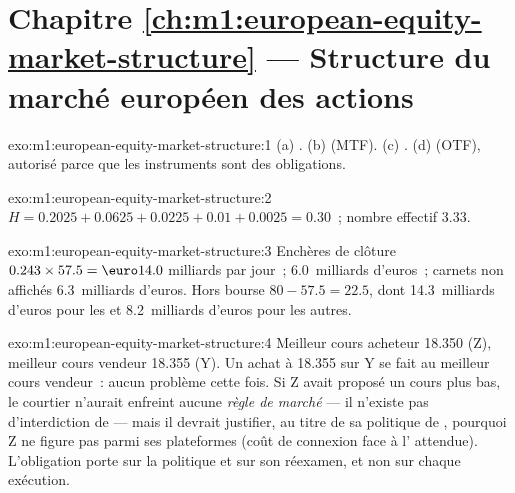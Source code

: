 \section*{Chapitre \ref{ch:m1:european-equity-market-structure} --- Structure du marché européen des actions}

\begin{solution}{exo:m1:european-equity-market-structure:1}
(a) . (b)  (MTF). (c)
. (d)  (OTF), autorisé parce que les
instruments sont des obligations.
\end{solution}

\begin{solution}{exo:m1:european-equity-market-structure:2}
$H = 0.2025 + 0.0625 + 0.0225 + 0.01 + 0.0025 = 0.30$~; nombre effectif
3.33.
\end{solution}

\begin{solution}{exo:m1:european-equity-market-structure:3}
Enchères de clôture $0.243 \times 57.5 = \text{\euro}14.0$ milliards par jour~;
 6.0~milliards d'euros~; carnets non affichés 6.3~milliards d'euros.
Hors bourse $80 - 57.5 = 22.5$, dont 14.3~milliards d'euros pour les  et 8.2~milliards d'euros pour les autres.
\end{solution}

\begin{solution}{exo:m1:european-equity-market-structure:4}
Meilleur cours acheteur 18.350 (Z), meilleur cours vendeur 18.355 (Y). Un achat à 18.355 sur Y se fait au
meilleur cours vendeur~: aucun problème cette fois. Si Z avait proposé un cours plus bas, le courtier
n'aurait enfreint aucune \emph{règle de marché} --- il n'existe pas d'interdiction de  ---
mais il devrait justifier, au titre de sa politique de , pourquoi Z ne figure pas
parmi ses plateformes (coût de connexion face à l'
attendue). L'obligation porte sur la politique et sur son réexamen, et non sur
chaque exécution.
\end{solution}

